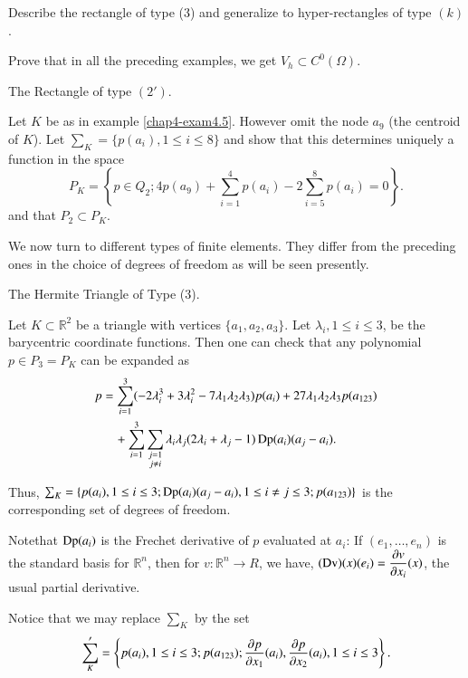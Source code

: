\begin{exercise}\label{chap4-exer4.3}
Describe the rectangle of type (3) and generalize to hyper-rectangles
of type $(k)$.
\end{exercise}

\begin{exercise}\label{chap4-exer4.4}
Prove that in all the preceding examples, we get $V_{h}\subset C^{0}(\Omega)$.
\end{exercise}

\begin{exercise}\label{chap4-exer4.5}
The Rectangle of type $(2')$.


Let $K$ be as in example \ref{chap4-exam4.5}. However omit the node
$a_{9}$ (the centroid of $K$). Let $\sum_{K}=\{p(a_{i}),1\leq i\leq
8\}$ and show that this determines uniquely a function in the space
$$
P_{K}=\left\{p\in Q_{2};
4p(a_{9})+\sum^{4}_{i=1}p(a_{i})-2\sum^{8}_{i=5}p(a_{i})=0\right\}. 
$$
and that $P_{2}\subset P_{K}$.
\end{exercise}

We now turn to different types of finite elements. They differ from
the preceding ones in the choice of degrees of freedom as will be seen
presently. 

\begin{example}\label{chap4-exam4.6}
The Hermite Triangle of Type (3).

Let $K\subset \mathbb{R}^{2}$ be a triangle with vertices
$\{a_{1},a_{2},a_{3}\}$. Let $\lambda_{i},1\leq i\leq 3$, be the
barycentric coordinate functions. Then one can check that any
polynomial $p\in P_{3}=P_{K}$ can be expanded as
\begin{align*}
p &=
\sum^{3}_{i=1}(-2\lambda^{3}_{i}+3\lambda^{2}_{i}-7\lambda_{1}\lambda_{2}\lambda_{3})p(a_{i})+27\lambda_{1}\lambda_{2}\lambda_{3}p(a_{123})\\
&\quad +\sum^{3}_{i=1}\sum_{\substack{j=1\\ j\neq
    i}}\lambda_{i}\lambda_{j}(2\lambda_{i}+\lambda_{j}-1)\operatorname{Dp}(a_{i})(a_{j}-a_{i}). 
\end{align*}

Thus, $\sum_{K}=\{p(a_{i}),1\leq i\leq 3;\operatorname{Dp}
(a_{i})(a_{j}-a_{i}),1\leq i\neq j\leq 3;p(a_{123})\}$ is the
corresponding set of degrees of freedom.

Note\pageoriginale that $\operatorname{Dp}(a_{i})$ is the Frechet derivative of $p$
evaluated at $a_{i}$: If $(e_{1},\ldots,e_{n})$ is the standard basis
for $\mathbb{R}^{n}$, then for $v:\mathbb{R}^{n}\to R$, we have,
$(\operatorname{Dv})(x)(e_{i})=\dfrac{\partial v}{\partial x_{i}}(x)$, the usual partial
derivative.

Notice that we may replace $\sum_{K}$ by the set
$$
\sum'_{K}=\left\{p(a_{i}),1\leq i\leq 3; p(a_{123});\frac{\partial p}{\partial
  x_{1}}(a_{i}), \frac{\partial p}{\partial x_{2}}(a_{i}), 1\leq i\leq 3\right\}.
$$
\end{example}

